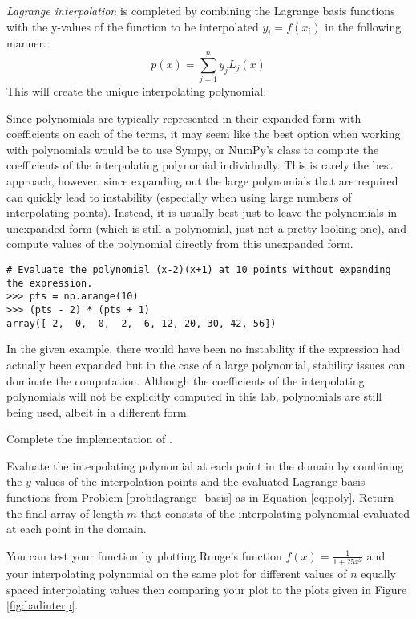 \emph{Lagrange interpolation} is completed by combining the Lagrange basis functions with the y-values of the function to be interpolated $y_i=f(x_i)$ in the following manner: 
\begin{equation}
\label{eq:poly}
p(x) = \sum_{j=1}^n y_j L_j(x)
\end{equation}
This will create the unique interpolating polynomial.

Since polynomials are typically represented in their expanded form with coefficients on each of the terms, it may seem like the best option when working with polynomials would be to use Sympy, or NumPy's
 class to compute the coefficients of the interpolating polynomial individually.
This is rarely the best approach, however, since expanding out the large polynomials that are required can quickly lead to instability (especially when using large
numbers of interpolating points).
Instead, it is usually best just to leave the polynomials in unexpanded form (which is still a polynomial, just not a pretty-looking one), and compute values of the polynomial directly from this unexpanded form.

\begin{lstlisting}
# Evaluate the polynomial (x-2)(x+1) at 10 points without expanding the expression.
>>> pts = np.arange(10)
>>> (pts - 2) * (pts + 1)
array([ 2,  0,  0,  2,  6, 12, 20, 30, 42, 56])
\end{lstlisting}
In the given example, there would have been no instability if the expression had actually been expanded but in the case of a large polynomial, stability issues can dominate the computation.
Although the coefficients of the interpolating polynomials will not be explicitly computed in this lab, polynomials are still being used, albeit in a different form.

\begin{problem}

Complete the implementation of . 

Evaluate the interpolating polynomial at each point in the domain by combining the $y$ values of the interpolation points and the evaluated Lagrange basis functions from Problem \ref{prob:lagrange_basis} as in Equation \ref{eq:poly}. 
Return the final array of length $m$ that consists of the interpolating polynomial evaluated at each point in the domain.

You can test your function by plotting Runge's function $f(x)=\frac{1}{1+25x^2}$ and your interpolating polynomial on the same plot for different values of $n$ equally spaced interpolating values then comparing
your plot to the plots given in Figure \ref{fig:badinterp}.
\label{prob:lagrange}
\end{problem}

